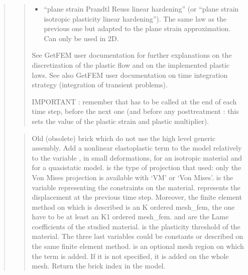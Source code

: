\documentclass[a4paper,11pt,english]{sphinxmanual}
\begin{document}
\begin{quote}
\begin{quote}
\begin{itemize}
\item {} 
“plane strain Prandtl Reuss linear hardening”
(or “plane strain isotropic plasticity linear hardening”).
The same law as the previous one but adapted to the plane strain
approximation. Can only be used in 2D.

\end{itemize}

See GetFEM user documentation for further explanations on the
discretization of the plastic flow and on the implemented plastic laws.
See also GetFEM user documentation on time integration strategy
(integration of transient problems).

IMPORTANT : remember that  has
to be called at the end of each time step, before the next one
(and before any post\sphinxhyphen{}treatment : this sets the value of the plastic
strain and plastic multiplier).
\end{quote}

\begin{quote}

Old (obsolete) brick which do not use the high level generic
assembly. Add a nonlinear elastoplastic term to the model relatively
to the variable , in small deformations, for an isotropic
material and for a quasistatic model.  is the type of
projection that used: only the Von Mises projection is
available with ‘VM’ or ‘Von Mises’.
 is the variable representing the constraints on the material.
 represents the displacement at the previous time step.
Moreover, the finite element method on which  is described
is an K ordered mesh\_fem, the  one have to be at least
an K\sphinxhyphen{}1 ordered mesh\_fem.
 and  are the Lame coefficients of the studied
material.
 is the plasticity threshold of the material.
The three last variables could be constants or described on the
same finite element method.
 is an optional mesh region on which the term is added.
If it is not specified, it is added on the whole mesh.
Return the brick index in the model.
\end{quote}


\end{quote}
\end{document}
